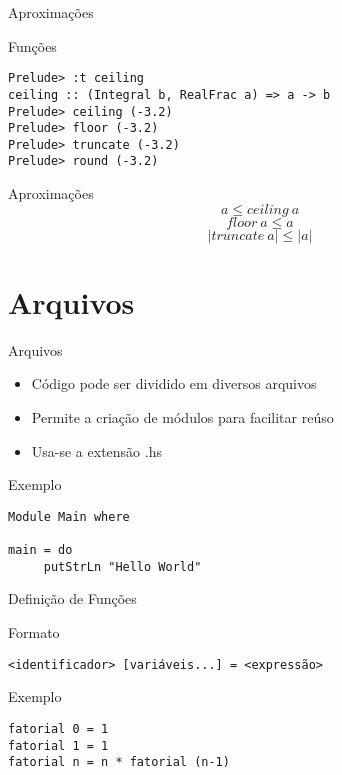\documentclass{beamer}
\begin{document}
			\begin{frame}[fragile]{Aproximações}
			 \begin{block}{Funções}
			  \begin{lstlisting}
Prelude> :t ceiling
ceiling :: (Integral b, RealFrac a) => a -> b
Prelude> ceiling (-3.2)
Prelude> floor (-3.2)
Prelude> truncate (-3.2)
Prelude> round (-3.2)
			  \end{lstlisting}
			 \end{block}
			\end{frame}
			
			\begin{frame}{Aproximações}
			 \[ a \leq ceiling~ a\]
			 \[ floor~ a \leq a\]
			 \[ \left|truncate~ a\right| \leq \left|a\right|\]
			\end{frame}

	\section{Arquivos}
	
		\begin{frame}[fragile]{Arquivos}
		 \begin{itemize}
		  \item Código pode ser dividido em diversos arquivos
		  \item Permite a criação de módulos para facilitar reúso
		  \item Usa-se a extensão .hs
		 \end{itemize}
		 
		 \begin{block}{Exemplo}
		  \begin{lstlisting}
Module Main where

main = do
     putStrLn "Hello World"
		  \end{lstlisting}
		 \end{block}
		\end{frame}
		
		\begin{frame}[fragile]{Definição de Funções}
		 \begin{block}{Formato}
		  \begin{lstlisting}
<identificador> [variáveis...] = <expressão>
		  \end{lstlisting}
		 \end{block}
		 
		 \begin{block}{Exemplo}
		  \begin{lstlisting}
fatorial 0 = 1
fatorial 1 = 1
fatorial n = n * fatorial (n-1)
		  \end{lstlisting}
		 \end{block}
		\end{frame}
		
\end{document}

